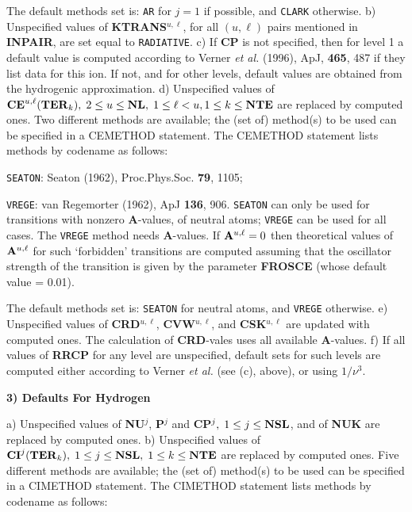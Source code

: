 The default methods set is: {\tt AR} for $j = 1$ if possible,
and {\tt CLARK} otherwise.
\blankline
b) Unspecified values of {\bf KTRANS}$^{u,\ell}$, for all $(u,\ell)$ pairs
mentioned in {\bf INPAIR}, are set equal to {\tt RADIATIVE}.
\blankline
c) If {\bf CP} is not specified, then for level 1 a default value is
computed according to Verner {\it et al.} (1996), ApJ, {\bf 465}, 487
if they list data for this ion. If not, and for other levels, default
values are obtained from the hydrogenic approximation.
\blankline
d) Unspecified values of
${\bf CE}^{u,\ell}({\bf TER}_k), \; 2 \leq u \leq {\bf NL}, \;
1 \leq \ell < u, \break 1 \leq k \leq {\bf NTE}$ are replaced by computed ones.
Two different methods are available; the (set of) method(s) to be used
can be specified in a CEMETHOD statement. The CEMETHOD statement lists
methods by codename as follows:

{\tt SEATON}: \quad Seaton (1962), Proc.Phys.Soc. {\bf 79}, 1105;

{\tt VREGE}: \quad van Regemorter (1962), ApJ {\bf 136}, 906. \np
{\tt SEATON} can only be used for transitions with nonzero
{\bf A}-values, of neutral atoms; {\tt VREGE} can be
used for all cases. The {\tt VREGE} method needs {\bf A}-values.
If ${\bf A}^{u,\ell} = 0$ then theoretical values of ${\bf A}^{u,\ell}$
for such `forbidden' transitions are computed assuming that the
oscillator strength of the transition is given by the parameter
{\bf FROSCE} (whose default value = 0.01).

The default methods set is: {\tt SEATON} for neutral atoms,
and {\tt VREGE} otherwise.
\blankline
e) Unspecified values of {\bf CRD}$^{u,\ell}$, {\bf CVW}$^{u, \ell}$,
and {\bf CSK}$^{u, \ell}$ are updated with computed ones.
The calculation of {\bf CRD}-vales uses all available {\bf A}-values.
\blankline
f) If all values of {\bf RRCP} for any level are unspecified,
default sets for such levels
are computed either according to Verner {\it et al.} (see (c), above),
or using $1/{\nu^3}$.
\ej
\centerline{\bf 3) Defaults For Hydrogen}
\blankline
a) Unspecified values of {\bf NU}$^j$, {\bf P}$^j$ and {\bf CP}$^j, 
\; 1 \leq j \leq {\bf NSL}$, and of {\bf NUK} are replaced by
computed ones.
\blankline
b) Unspecified values of
${\bf CI}^j({\bf TER}_k), \; 1 \leq j \leq {\bf NSL}, \; 1 \leq k 
\leq {\bf NTE}$ are replaced by computed ones. Five different methods are
available; the (set of) method(s) to be used can be specified in a
CIMETHOD statement. The \break CIMETHOD statement lists methods by codename
as follows:

